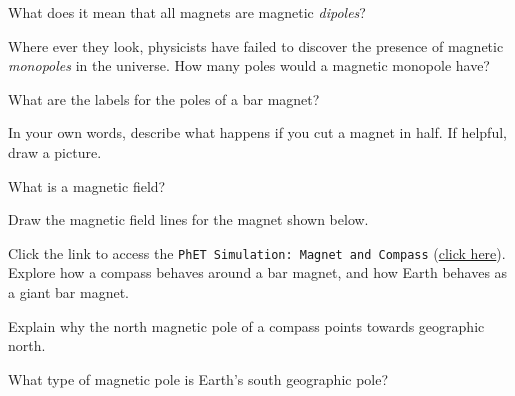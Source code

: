 \documentclass{article}
\begin{document}
\begin{exercise}
    What does it mean that all magnets are magnetic \textit{dipoles}?
\end{exercise}

\begin{exercise}
    Where ever they look, physicists have failed to discover the presence of magnetic \textit{monopoles} in the universe. How many poles would a magnetic monopole have?
\end{exercise}

\begin{exercise}
    What are the labels for the poles of a bar magnet?
\end{exercise}


\begin{exercise}
    In your own words, describe what happens if you cut a magnet in half. If helpful, draw a picture.
\end{exercise}

\begin{exercise}
    What is a magnetic field?
\end{exercise}

\begin{exercise}
    Draw the magnetic field lines for the magnet shown below.

\begin{center}
\end{center}
\end{exercise}

\begin{exercise}
    Click the link to access the \texttt{PhET Simulation: Magnet and Compass} (\href{https://phet.colorado.edu/en/simulations/magnet-and-compass}{click here}). Explore how a compass behaves around a bar magnet, and how Earth behaves as a giant bar magnet.
\end{exercise}

\begin{exercise}
    Explain why the north magnetic pole of a compass points towards geographic north. 
\end{exercise}

\begin{exercise}
    What type of magnetic pole is Earth's south geographic pole?
\end{exercise}
\end{document}
